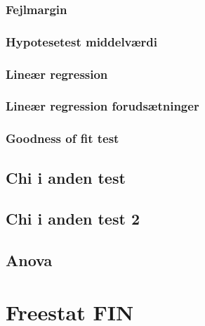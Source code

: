 \documentclass[]{book}
\begin{document}
\hypertarget{fejlmargin}{%
\subsubsection{Fejlmargin}\label{fejlmargin}}

\hypertarget{hypotesetest-middelvrdi}{%
\subsubsection{Hypotesetest middelværdi}\label{hypotesetest-middelvrdi}}

\hypertarget{liner-regression}{%
\subsubsection{Lineær regression}\label{liner-regression}}

\hypertarget{liner-regression-forudstninger}{%
\subsubsection{Lineær regression forudsætninger}\label{liner-regression-forudstninger}}

\hypertarget{goodness-of-fit-test}{%
\subsubsection{Goodness of fit test}\label{goodness-of-fit-test}}

\hypertarget{chi-i-anden-test}{%
\subsection{Chi i anden test}\label{chi-i-anden-test}}

\hypertarget{chi-i-anden-test-2}{%
\subsection{Chi i anden test 2}\label{chi-i-anden-test-2}}

\hypertarget{anova}{%
\subsection{Anova}\label{anova}}

\hypertarget{freestat-fin}{%
\section{Freestat FIN}\label{freestat-fin}}
\end{document}
